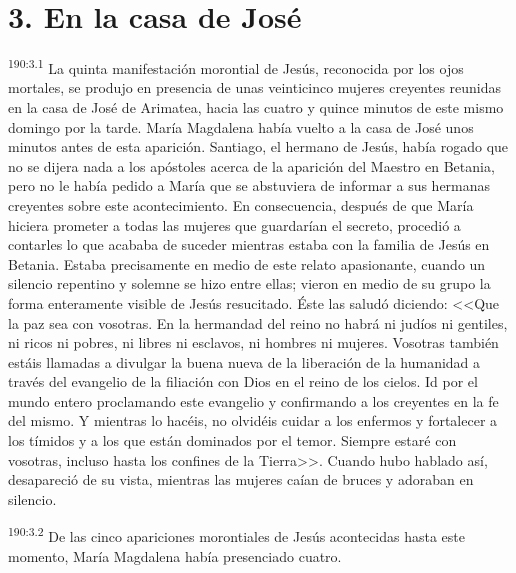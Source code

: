 \section*{3. En la casa de José}
\par 
\textsuperscript{190:3.1} La quinta manifestación morontial de Jesús, reconocida por los ojos mortales, se produjo en presencia de unas veinticinco mujeres creyentes reunidas en la casa de José de Arimatea, hacia las cuatro y quince minutos de este mismo domingo por la tarde. María Magdalena había vuelto a la casa de José unos minutos antes de esta aparición. Santiago, el hermano de Jesús, había rogado que no se dijera nada a los apóstoles acerca de la aparición del Maestro en Betania, pero no le había pedido a María que se abstuviera de informar a sus hermanas creyentes sobre este acontecimiento. En consecuencia, después de que María hiciera prometer a todas las mujeres que guardarían el secreto, procedió a contarles lo que acababa de suceder mientras estaba con la familia de Jesús en Betania. Estaba precisamente en medio de este relato apasionante, cuando un silencio repentino y solemne se hizo entre ellas; vieron en medio de su grupo la forma enteramente visible de Jesús resucitado. Éste las saludó diciendo: <<Que la paz sea con vosotras. En la hermandad del reino no habrá ni judíos ni gentiles, ni ricos ni pobres, ni libres ni esclavos, ni hombres ni mujeres. Vosotras también estáis llamadas a divulgar la buena nueva de la liberación de la humanidad a través del evangelio de la filiación con Dios en el reino de los cielos. Id por el mundo entero proclamando este evangelio y confirmando a los creyentes en la fe del mismo. Y mientras lo hacéis, no olvidéis cuidar a los enfermos y fortalecer a los tímidos y a los que están dominados por el temor. Siempre estaré con vosotras, incluso hasta los confines de la Tierra>>. Cuando hubo hablado así, desapareció de su vista, mientras las mujeres caían de bruces y adoraban en silencio.

\par 
\textsuperscript{190:3.2} De las cinco apariciones morontiales de Jesús acontecidas hasta este momento, María Magdalena había presenciado cuatro.

